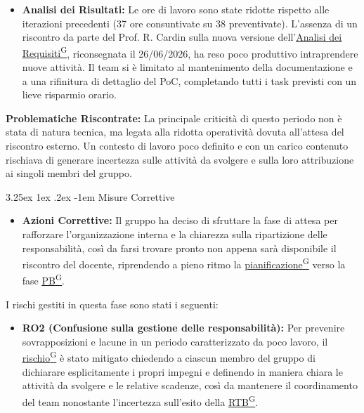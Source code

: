 \documentclass[a4paper,12pt]{article}
\makeatletter
\renewcommand\paragraph{\@startsection{paragraph}{5}{\z@}%
  {3.25ex \@plus1ex \@minus.2ex}%
  {-1em}%
  {\normalfont\normalsize\bfseries}}
\providecommand{\glslink}[2]{\href{https://alittlebyte-19.github.io/Documentazione/glossario.html\#gls-#1}{\underline{#2}\textsuperscript{\scriptsize G}}}
\makeatother
\begin{document}
\begin{itemize}
    \item \textbf{Analisi dei Risultati:} Le ore di lavoro sono state ridotte rispetto alle iterazioni precedenti (37 ore consuntivate su 38 preventivate). L'assenza di un riscontro da parte del Prof. R. Cardin sulla nuova versione dell'\glslink{analisi-dei-requisiti-adr}{Analisi dei Requisiti}, riconsegnata il 26/06/2026, ha reso poco produttivo intraprendere nuove attività. Il team si è limitato al mantenimento della documentazione e a una rifinitura di dettaglio del PoC, completando tutti i task previsti con un lieve risparmio orario.
\end{itemize}
\textbf{Problematiche Riscontrate:} La principale criticità di questo periodo non è stata di natura tecnica, ma legata alla ridotta operatività dovuta all'attesa del riscontro esterno. Un contesto di lavoro poco definito e con un carico contenuto rischiava di generare incertezza sulle attività da svolgere e sulla loro attribuzione ai singoli membri del gruppo.


\paragraph{Misure Correttive}

\begin{itemize}
    \item \textbf{Azioni Correttive:} Il gruppo ha deciso di sfruttare la fase di attesa per rafforzare l'organizzazione interna e la chiarezza sulla ripartizione delle responsabilità, così da farsi trovare pronto non appena sarà disponibile il riscontro del docente, riprendendo a pieno ritmo la \glslink{pianificazione}{pianificazione} verso la fase \glslink{pb-product-baseline}{PB}.
\end{itemize}
I rischi gestiti in questa fase sono stati i seguenti:
\begin{itemize}
    \item \textbf{RO2 (Confusione sulla gestione delle responsabilità):} Per prevenire sovrapposizioni e lacune in un periodo caratterizzato da poco lavoro, il \glslink{rischio}{rischio} è stato mitigato chiedendo a ciascun membro del gruppo di dichiarare esplicitamente i propri impegni e definendo in maniera chiara le attività da svolgere e le relative scadenze, così da mantenere il coordinamento del team nonostante l'incertezza sull'esito della \glslink{rtb-requirements-and-technology-baseline}{RTB}.
\end{itemize}
\end{document}
